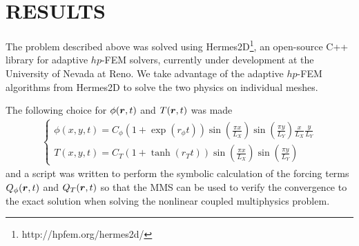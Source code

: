 \section*{RESULTS}
\vspace{-4mm}
The problem described above was solved using Hermes2D\footnote{http://hpfem.org/hermes2d/}, an open-source C++ library for adaptive $hp$-FEM solvers, currently under development at the University of Nevada at Reno.  We take advantage of the adaptive $hp$-FEM algorithms \cite{solin2010} from Hermes2D to solve the two physics on individual meshes.


The following choice for $\phi(\boldsymbol{r},t)$ and $T(\boldsymbol{r},t)$ was made
\begin{align}
  \left\{ \begin{array}{l}
      \phi(x,y,t) = C_\phi \left(1+\exp(r_\phi t)\right) \sin\left(\frac{\pi x}{L_X}\right) \sin\left(\frac{\pi y}{L_Y}\right) \frac{x}{L_X} \frac{y}{L_Y} \\
      T(x,y,t) = C_T \left(1+\tanh(r_T t)\right) \sin\left(\frac{\pi x}{L_X}\right) \sin\left(\frac{\pi y}{L_Y}\right)
  \end{array} \right.
\end{align}
and a script was written to perform the symbolic calculation of the forcing terms $Q_{\phi}(\boldsymbol{r},t)$ and $Q_T(\boldsymbol{r},t)$ so that the MMS can be used to verify the convergence to the exact solution when solving the nonlinear coupled multiphysics problem.


